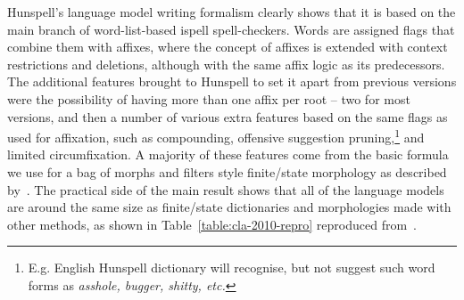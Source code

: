 \documentclass[officiallayout,final]{unihelcompling}
\begin{document}
Hunspell's language model writing formalism clearly shows that it is based on
the main branch of word-list-based ispell spell-checkers. Words are assigned
flags that combine them with affixes, where the concept of affixes is extended
with context restrictions and deletions, although with the same affix logic as
its predecessors. The additional features brought to Hunspell to set it apart
from previous versions were the possibility of having more than one affix per
root -- two for most versions, and then a number of various extra features based
on the same flags as used for affixation, such as compounding, offensive
suggestion pruning,\footnote{E.g. English Hunspell dictionary will recognise,
but not suggest such word forms as \emph{asshole, bugger, shitty, etc.}} and
limited circumfixation.  A majority of these features come from the basic
formula we use for a bag of morphs and filters style finite\-/state morphology
as described by~\citet{linden2009hfst}. The practical side of the main result
shows that all of the language models are around the same size as
finite\-/state dictionaries and morphologies made with other methods, as shown
in Table~\ref{table:cla-2010-repro} reproduced
from~.
\end{document}
